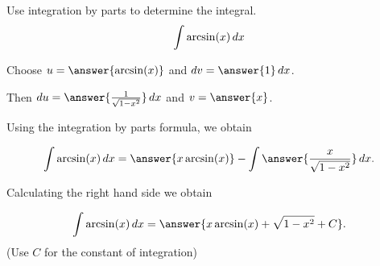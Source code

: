 \documentclass{ximera}
\author{Jason Miller and Jim Talamo}
\begin{document}
\begin{exercise}
Use integration by parts to determine the integral.
\[
\int \arcsin(x) \mathop{}\!d x 
\]


Choose $u=\answer{ \arcsin(x) }$ and $\d v=\answer{1 } \d x$. 

Then $\d u= \answer{ \frac{1}{\sqrt{1-x^{2}}} } \d x$ and $v= \answer{x}$.

Using the integration by parts formula, we obtain

\[
\int \arcsin(x) \d x= \answer{x\arcsin(x)} - \int \answer{ \frac{x}{\sqrt{1-x^{2}}} } \d x.
\]

Calculating the right hand side we obtain

\[
\int \arcsin(x) \d x= \answer{x\arcsin(x)+\sqrt{1-x^2}+C}.
\]
(Use $C$ for the constant of integration)

\end{exercise}
\end{document}

